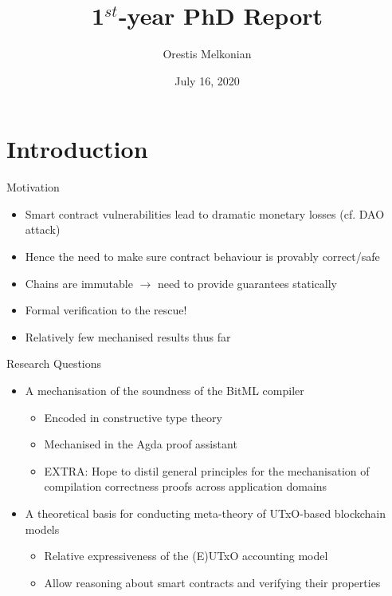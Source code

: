 \documentclass[aspectratio=43]{beamer}
\title{1$^{st}$-year PhD Report}
\author{Orestis Melkonian}
\date{July 16, 2020}
\renewcommand\alert[1]{\textcolor{mLightBrown}{#1}}
\begin{document}
\begin{center}
\maketitle
{}
\end{center}



\section{Introduction}

\begin{frame}{Motivation}
\begin{itemize}
\item Smart contract vulnerabilities lead to dramatic monetary losses (cf. DAO attack)
\item Hence the need to make sure contract behaviour is provably correct/safe
\item Chains are immutable $\to$ need to provide guarantees \alert{statically}
\item Formal verification to the rescue!
\item Relatively few mechanised results thus far
\end{itemize}
\end{frame}

\begin{frame}{Research Questions}
\begin{itemize}
\item A mechanisation of the soundness of the BitML compiler
  \begin{itemize}
  \item Encoded in constructive type theory
  \item Mechanised in the Agda proof assistant
  \item \alert{EXTRA}: Hope to distil general principles for the mechanisation
  of compilation correctness proofs across application domains
  \end{itemize}
\item A theoretical basis for conducting meta-theory of UTxO-based blockchain models
  \begin{itemize}
  \item Relative expressiveness of the (E)UTxO accounting model
  \item Allow reasoning about smart contracts and verifying their properties
  \end{itemize}
\end{itemize}
\end{frame}
\end{document}
